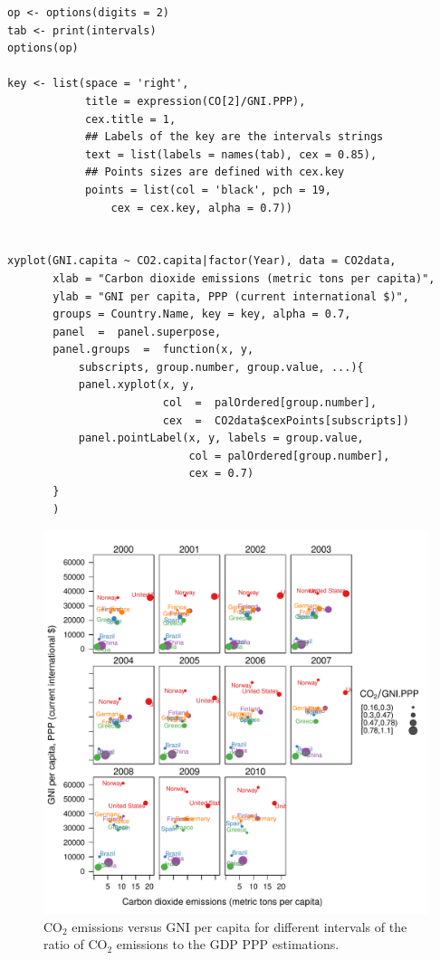 \documentclass[smallroyalvopaper]{memoir}
\begin{document}
\lstset{language=r,label= ,caption= ,captionpos=b,numbers=none}
\begin{lstlisting}
op <- options(digits = 2)
tab <- print(intervals)
options(op)
  
key <- list(space = 'right',
            title = expression(CO[2]/GNI.PPP),
            cex.title = 1,
            ## Labels of the key are the intervals strings
            text = list(labels = names(tab), cex = 0.85),
            ## Points sizes are defined with cex.key
            points = list(col = 'black', pch = 19,
                cex = cex.key, alpha = 0.7))

  
xyplot(GNI.capita ~ CO2.capita|factor(Year), data = CO2data,
       xlab = "Carbon dioxide emissions (metric tons per capita)",
       ylab = "GNI per capita, PPP (current international $)",
       groups = Country.Name, key = key, alpha = 0.7,
       panel  =  panel.superpose,
       panel.groups  =  function(x, y,
           subscripts, group.number, group.value, ...){
           panel.xyplot(x, y,
                        col  =  palOrdered[group.number],
                        cex  =  CO2data$cexPoints[subscripts])
           panel.pointLabel(x, y, labels = group.value,
                            col = palOrdered[group.number],
                            cex = 0.7)
       }
       ) 
\end{lstlisting}

\begin{figure}[htbp]
\centering
\includegraphics[width=.9\linewidth]{figs/CO2points.pdf}
\caption{\(\mathrm{CO_2}\) emissions versus GNI per capita for different intervals of the ratio of \(\mathrm{CO_2}\) emissions to the GDP PPP estimations. \label{fig:CO2points}}
\end{figure}
\end{document}
